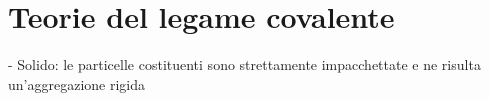 \section{Teorie del legame covalente}
- Solido: le particelle costituenti sono strettamente impacchettate e ne risulta un'aggregazione rigida
